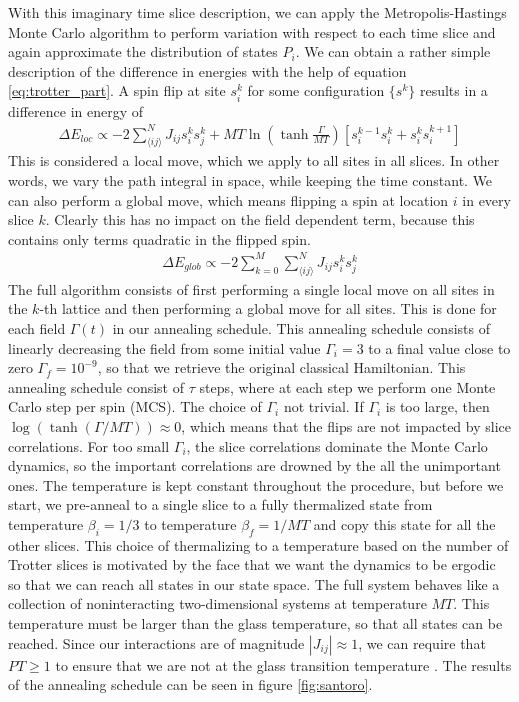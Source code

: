 With this imaginary time slice description, we can apply the Metropolis-Hastings Monte Carlo algorithm to perform variation with respect to each time slice and again approximate the distribution of states $P_i$. We can obtain a rather simple description of the difference in energies with the help of equation \ref{eq:trotter_part}. A spin flip at site $s^k_i$ for some configuration $\{s^k\}$ results in a difference in energy of 
\begin{align*}
    \Delta E_{loc} \propto -2 \sum_{\langle ij \rangle}^N J_{ij} s_i^k s_j^k + MT\ln{\left(\tanh{\frac{\Gamma}{MT}}\right)}\left[s_i^{k-1} s_i^{k} + s_i^k s_i^{k+1}\right]
\end{align*}
This is considered a local move, which we apply to all sites in all slices. In other words, we vary the path integral in space, while keeping the time constant. We can also perform a global move, which means flipping a spin at location $i$ in every slice $k$. Clearly this has no impact on the field dependent term, because this contains only terms quadratic in the flipped spin. 
\begin{align*}
    \Delta E_{glob} \propto -2 \sum_{k=0}^M\sum_{\langle ij \rangle}^N J_{ij} s_i^k s_j^k
\end{align*}
The full algorithm consists of first performing a single local move on all sites in the $k$-th lattice and then performing a global move for all sites. This is done for each field $\Gamma(t)$ in our annealing schedule. This annealing schedule consists of linearly decreasing the field from some initial value $\Gamma_i=3$ to a final value close to zero $\Gamma_f=10^{-9}$, so that we retrieve the original classical Hamiltonian. This annealing schedule consist of $\tau$ steps, where at each step we perform one Monte Carlo step per spin (MCS). The choice of $\Gamma_i$ not trivial. If $\Gamma_i$ is too large, then $\log(\tanh(\Gamma / MT))\approx 0$, which means that the flips are not impacted by slice correlations. For too small $\Gamma_i$, the slice correlations dominate the Monte Carlo dynamics, so the important correlations are drowned by the all the unimportant ones. The temperature is kept constant throughout the procedure, but before we start, we pre-anneal to a single slice to a  fully thermalized state from temperature $\beta_i = 1/3$ to temperature $\beta_f = 1/MT$ and copy this state for all the other slices. 
This choice of thermalizing to a temperature based on the number of Trotter slices is motivated by the face that we want the dynamics to be ergodic so that we can reach all states in our state space. The full system behaves like a collection of noninteracting two-dimensional systems at temperature $MT$. This temperature must be larger than the glass temperature, so that all states can be reached. Since our interactions are of magnitude $|J_{ij}| \approx 1$, we can require that $PT\geq 1$ to ensure that we are not at the glass transition temperature \cite{Santoro2002}. The results of the annealing schedule can be seen in figure \ref{fig:santoro}.
